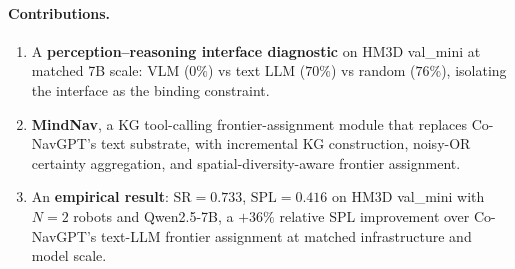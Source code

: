\paragraph{Contributions.}
\begin{enumerate}
    \item A \textbf{perception--reasoning interface diagnostic} on HM3D
    val\_mini at matched 7B scale: VLM ($0\%$) vs text LLM ($70\%$) vs random
    ($76\%$), isolating the interface as the binding constraint.
    \item \textbf{MindNav}, a KG tool-calling frontier-assignment module that
    replaces Co-NavGPT's text substrate, with incremental KG construction,
    noisy-OR certainty aggregation, and spatial-diversity-aware frontier
    assignment.
    \item An \textbf{empirical result}: $\mathrm{SR}{=}0.733$, $\mathrm{SPL}{=}0.416$
    on HM3D val\_mini with $N{=}2$ robots and Qwen2.5-7B, a $+36\%$ relative
    SPL improvement over Co-NavGPT's text-LLM frontier assignment at matched
    infrastructure and model scale.
\end{enumerate}
